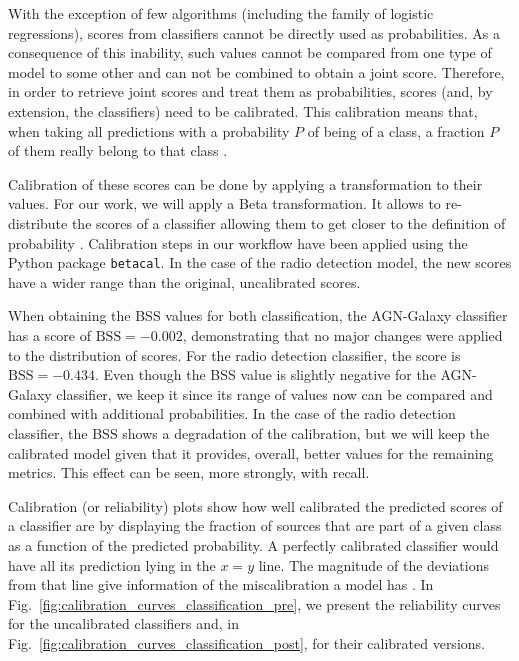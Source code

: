 \documentclass{aa}
\begin{document}
\begin{appendix}
With the exception of few algorithms (including the family of logistic regressions), scores from classifiers cannot be directly used as probabilities. As a consequence of this inability, such values cannot be compared from one type of model to some other and can not be combined to obtain a joint score.
Therefore, in order to retrieve joint scores and treat them as probabilities, scores (and, by extension, the classifiers) need to be calibrated. This calibration means that, when taking all predictions with a probability $P$ of being of a class, a fraction $P$ of them really belong to that class \citep[e.g.][]{lichtenstein_1982, 2021arXiv211210327S}.

Calibration of these scores can be done by applying a transformation to their values. For our work, we will apply a Beta transformation. It allows to re-distribute the scores of a classifier allowing them to get closer to the definition of probability \citep{10.1214/17-EJS1338SI, pmlr-v54-kull17a}. Calibration steps in our workflow have been applied using the Python package \verb|betacal|. In the case of the radio detection model, the new scores have a wider range than the original, uncalibrated scores.%

When obtaining the BSS values for both classification, the AGN-Galaxy classifier has a score of ${\mathrm{BSS} = -0.002}$, demonstrating that no major changes were applied to the distribution of scores. For the radio detection classifier, the score is ${\mathrm{BSS} = -0.434}$. Even though the BSS value is slightly negative for the AGN-Galaxy classifier, we keep it since its range of values now can be compared and combined with additional probabilities. In the case of the radio detection classifier, the BSS shows a degradation of the calibration, but we will keep the calibrated model given that it provides, overall, better values for the remaining metrics. This effect can be seen, more strongly, with recall.

Calibration (or reliability) plots show how well calibrated the predicted scores of a classifier are by displaying the fraction of sources that are part of a given class as a function of the predicted probability. A perfectly calibrated classifier would have all its prediction lying in the ${x{=}y}$ line. The magnitude of the deviations from that line give information of the miscalibration a model has \citep[see, for instance,][]{ReliabilityofReliabilityDiagrams, VanCalster2019}. In Fig.~\ref{fig:calibration_curves_classification_pre}, we present the reliability curves for the uncalibrated classifiers and, in Fig.~\ref{fig:calibration_curves_classification_post}, for their calibrated versions.


\end{appendix}
\end{document}

